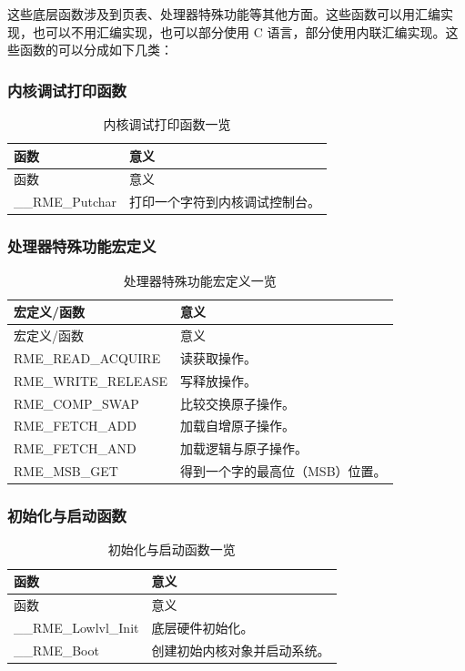 这些底层函数涉及到页表、处理器特殊功能等其他方面。这些函数可以用汇编实现，也可以不用汇编实现，也可以部分使用 C 语言，部分使用内联汇编实现。这些函数的可以分成如下几类：

\subsubsection{内核调试打印函数}\label{subsubsec:7-kernel-debug-print-function}

\begin{xltabular}{\textwidth}{@{}>{\hsize\raggedright\arraybackslash}X>{\hsize\raggedright\arraybackslash}X@{}}
\caption{内核调试打印函数一览}\label{tab:7-8-kernel-debug-print-function-overview}\\
\toprule
函数 & 意义\tabularnewline
\endfirsthead
\toprule
函数 & 意义\tabularnewline
\midrule
\endhead
\bottomrule
\endlastfoot
\_\_RME\_Putchar & 打印一个字符到内核调试控制台。\tabularnewline
\end{xltabular}

\subsubsection{处理器特殊功能宏定义}\label{subsubsec:7-processor-special-function-macros}

\begin{xltabular}{\textwidth}{@{}>{\hsize\raggedright\arraybackslash}X>{\hsize\raggedright\arraybackslash}X@{}}
\caption{处理器特殊功能宏定义一览}\label{tab:7-9-processor-special-function-macros-overview}\\
\toprule
宏定义/函数 & 意义\tabularnewline
\endfirsthead
\toprule
宏定义/函数 & 意义\tabularnewline
\midrule
\endhead
\bottomrule
\endlastfoot
RME\_READ\_ACQUIRE & 读获取操作。\tabularnewline
RME\_WRITE\_RELEASE & 写释放操作。\tabularnewline
RME\_COMP\_SWAP & 比较交换原子操作。\tabularnewline
RME\_FETCH\_ADD & 加载自增原子操作。\tabularnewline
RME\_FETCH\_AND & 加载逻辑与原子操作。\tabularnewline
RME\_MSB\_GET & 得到一个字的最高位（MSB）位置。\tabularnewline
\end{xltabular}

\subsubsection{初始化与启动函数}\label{subsubsec:7-init-and-boot-functions}

\begin{xltabular}{\textwidth}{@{}>{\hsize\raggedright\arraybackslash}X>{\hsize\raggedright\arraybackslash}X@{}}
\caption{初始化与启动函数一览}\label{tab:7-10-init-and-boot-functions-overview}\\
\toprule
函数 & 意义\tabularnewline
\endfirsthead
\toprule
函数 & 意义\tabularnewline
\midrule
\endhead
\bottomrule
\endlastfoot
\_\_RME\_Lowlvl\_Init & 底层硬件初始化。\tabularnewline
\_\_RME\_Boot & 创建初始内核对象并启动系统。\tabularnewline
\end{xltabular}

